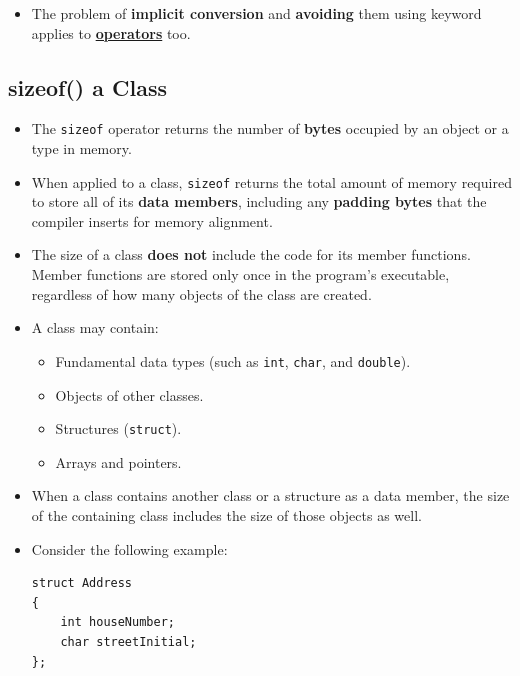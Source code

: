 \documentclass[10pt]{article}
\newcommand{\vocab}[1]{\fbox{\textbf{\textit{#1}}}}
\begin{document}
\begin{tcolorbox}
	\begin{itemize}
		\item The problem of \textbf{implicit conversion} and \textbf{avoiding} them using keyword \vocab{explicit} applies to \underline{\textbf{operators}} too.
	\end{itemize}
\end{tcolorbox}

\newpage

\subsection{sizeof() a Class}
\begin{itemize}
    \item The \verb|sizeof| operator returns the number of \textbf{bytes} occupied by an object or a type in memory.

    \item When applied to a class, \verb|sizeof| returns the total amount of memory required to store all of its \textbf{data members}, including any \textbf{padding bytes} that the compiler inserts for memory alignment.

    \item The size of a class \textbf{does not} include the code for its member functions. Member functions are stored only once in the program's executable, regardless of how many objects of the class are created.

    \item A class may contain:
    \begin{itemize}
        \item Fundamental data types (such as \verb|int|, \verb|char|, and \verb|double|).
        \item Objects of other classes.
        \item Structures (\verb|struct|).
        \item Arrays and pointers.
    \end{itemize}

    \item When a class contains another class or a structure as a data member, the
    size of the containing class includes the size of those objects as well.

    \item Consider the following example:

\begin{verbatim}
struct Address
{
    int houseNumber;
    char streetInitial;
};


\end{verbatim}
\end{itemize}
\end{document}
